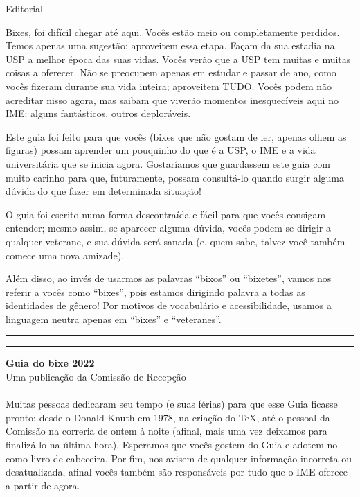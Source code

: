 \begin{editorial}{Editorial}

Bixes, foi difícil chegar até aqui. Vocês
estão meio ou completamente perdidos. Temos apenas uma sugestão: aproveitem essa
etapa. Façam da sua estadia na USP a melhor época das suas vidas. Vocês verão
que a USP tem muitas e muitas coisas a oferecer. Não se preocupem apenas em
estudar e passar de ano, como vocês fizeram durante sua vida inteira; aproveitem
TUDO. Vocês podem não acreditar nisso agora, mas saibam que viverão momentos
inesquecíveis aqui no IME: alguns fantásticos, outros deploráveis.

Este guia foi feito para que vocês (bixes que não gostam de ler, apenas olhem as figuras)
possam aprender um pouquinho do que é a USP,
o IME e a vida universitária que se inicia agora. 
Gostaríamos que guardassem este guia com muito carinho para que, futuramente, possam consultá-lo
quando surgir alguma dúvida do que fazer em determinada situação!

O guia foi escrito numa forma
descontraída e fácil para que vocês consigam entender; mesmo assim, se aparecer
alguma dúvida, vocês podem se dirigir a qualquer veterane, e sua dúvida será
sanada (e, quem sabe, talvez você também comece uma nova amizade).

Além disso, ao invés de usarmos as palavras ``bixos'' ou ``bixetes'', vamos nos referir
a vocês como ``bixes'', pois estamos dirigindo palavra a todas as identidades de 
gênero! Por motivos de vocabulário e acessibilidade, usamos a linguagem neutra 
apenas em ``bixes'' e ``veteranes''.


\rule{\textwidth}{0.5ex}\rule{2ex}{0.5ex}

{\large\bf Guia do bixe 2022} \\
Uma publicação da Comissão de Recepção

\paragraph{}
Muitas pessoas dedicaram seu tempo (e suas férias) para que esse Guia ficasse
pronto: desde o Donald Knuth em 1978, na criação do \TeX\makebox{}, até o
pessoal da Comissão na correria de ontem à noite (afinal, mais uma vez
deixamos para finalizá-lo na última hora). Esperamos que vocês gostem do Guia
e adotem-no como livro de cabeceira. Por fim, nos avisem de qualquer informação
incorreta ou desatualizada, afinal vocês também são responsáveis por tudo que o
IME oferece a partir de agora.


\end{editorial}

